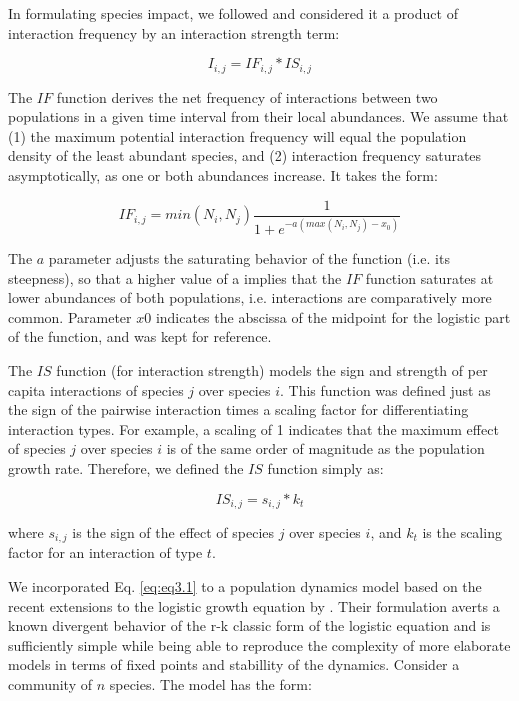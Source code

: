 In formulating species impact, we followed \cite{Poisot2015} and considered it a product of interaction frequency by an interaction strength term:

\begin{equation} \label{eq:eq3.1}
I_{i,j} = IF_{i,j} * IS_{i,j}
\end{equation}

The $IF$ function derives the net frequency of interactions between two populations in a given time interval from their local abundances. We assume that (1) the maximum potential interaction frequency will equal the population density of the least abundant species, and (2) interaction frequency saturates asymptotically, as one or both abundances increase. It takes the form:

\begin{equation} \label{eq:eq3.2}
IF_{i,j} = min(N_i,N_j) \frac{1}{1 + e^{-a(max(N_{i},N_{j}) - x_0)}}
\end{equation}

The $a$ parameter adjusts the saturating behavior of the function (i.e. its steepness), so that a higher value of a implies that the $IF$ function saturates at lower abundances of both populations, i.e. interactions are comparatively more common. Parameter $x0$ indicates the abscissa of the midpoint for the logistic part of the function, and was kept for reference.

The $IS$ function (for interaction strength) models the sign and strength of per capita interactions of species $j$ over species $i$. This function was defined just as the sign of the pairwise interaction times a scaling factor for differentiating interaction types. For example, a scaling of 1 indicates that the maximum effect of species $j$ over species $i$ is of the same order of magnitude as the population growth rate. Therefore, we defined the $IS$ function simply as:

\begin{equation} \label{eq:eq3.3}
IS_{i,j} = s_{i,j} * k_t
\end{equation}

where $s_{i,j}$ is the sign of the effect of species $j$ over species $i$, and $k_t$ is the scaling factor for an interaction of type $t$.

We incorporated Eq. \ref{eq:eq3.1} to a population dynamics model based on the recent extensions to the logistic growth equation by \cite{Garcia-Algarra2014}. Their formulation averts a known divergent behavior of the r-k classic form of the logistic equation and is sufficiently simple while being able to reproduce the complexity of more elaborate models in terms of fixed points and stabillity of the dynamics. Consider a community of $n$ species. The model has the form:

